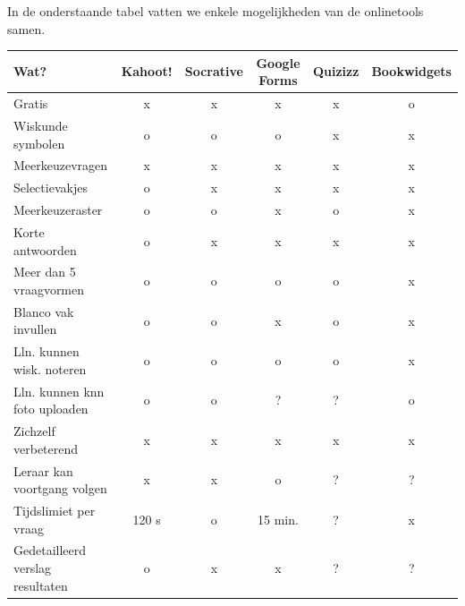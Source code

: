 In de onderstaande tabel vatten we enkele mogelijkheden van de onlinetools samen.
\vspace{0.5 cm}

\begin{tabular}{|l|c|c|c|c|c|}
\hline
\textbf{Wat?}  & \textbf{Kahoot!}  & \textbf{Socrative}  & \textbf{Google Forms}  & \textbf{Quizizz}  & \textbf{Bookwidgets} \\
\hline
Gratis  & x  & x  & x  & x  & o  \\
\hline
Wiskunde symbolen  & o  & o  & o  & x  & x \\
\hline
Meerkeuzevragen  & x  & x  & x  & x  & x  \\
\hline
Selectievakjes  & o  & x  & x  & x  & x  \\
\hline
Meerkeuzeraster  & o  & o  & x  & o  & x  \\
\hline
Korte antwoorden  & o  & x  & x  & x  & x  \\
\hline
Meer dan 5 vraagvormen  & o  & o  & o  & o  & x  \\
\hline
Blanco vak invullen  & o  & o  & x  & o  & x  \\
\hline
Lln. kunnen wisk. noteren  & o  & o  & o  & o  & x  \\
\hline
Lln. kunnen knn foto uploaden  & o  & o  & ?  & ?  & o  \\
\hline
Zichzelf verbeterend  & x  & x  & x  & x  & x  \\
\hline
Leraar kan voortgang volgen  & x  & x  & o  & ?  & ?  \\
\hline
Tijdslimiet per vraag  & 120 s  & o  & 15 min.  & ?  & x  \\
\hline
Gedetailleerd verslag resultaten  & o  & x  & x  & ?  & ?  \\
\hline
\end{tabular}
\vspace{1 cm}

